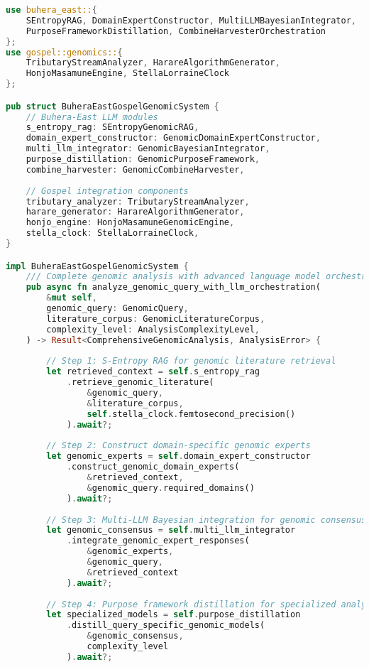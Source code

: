 \documentclass[12pt,a4paper]{article}
\begin{document}
\begin{lstlisting}[language=Rust, caption=Integrated Buhera-East Gospel Genomic System]
use buhera_east::{
    SEntropyRAG, DomainExpertConstructor, MultiLLMBayesianIntegrator,
    PurposeFrameworkDistillation, CombineHarvesterOrchestration
};
use gospel::genomics::{
    TributaryStreamAnalyzer, HarareAlgorithmGenerator, 
    HonjoMasamuneEngine, StellaLorraineClock
};

pub struct BuheraEastGospelGenomicSystem {
    // Buhera-East LLM modules
    s_entropy_rag: SEntropyGenomicRAG,
    domain_expert_constructor: GenomicDomainExpertConstructor,
    multi_llm_integrator: GenomicBayesianIntegrator,
    purpose_distillation: GenomicPurposeFramework,
    combine_harvester: GenomicCombineHarvester,
    
    // Gospel integration components
    tributary_analyzer: TributaryStreamAnalyzer,
    harare_generator: HarareAlgorithmGenerator,
    honjo_engine: HonjoMasamuneGenomicEngine,
    stella_clock: StellaLorraineClock,
}

impl BuheraEastGospelGenomicSystem {
    /// Complete genomic analysis with advanced language model orchestration
    pub async fn analyze_genomic_query_with_llm_orchestration(
        &mut self,
        genomic_query: GenomicQuery,
        literature_corpus: GenomicLiteratureCorpus,
        complexity_level: AnalysisComplexityLevel,
    ) -> Result<ComprehensiveGenomicAnalysis, AnalysisError> {
        
        // Step 1: S-Entropy RAG for genomic literature retrieval
        let retrieved_context = self.s_entropy_rag
            .retrieve_genomic_literature(
                &genomic_query,
                &literature_corpus,
                self.stella_clock.femtosecond_precision()
            ).await?;
        
        // Step 2: Construct domain-specific genomic experts
        let genomic_experts = self.domain_expert_constructor
            .construct_genomic_domain_experts(
                &retrieved_context,
                &genomic_query.required_domains()
            ).await?;
        
        // Step 3: Multi-LLM Bayesian integration for genomic consensus
        let genomic_consensus = self.multi_llm_integrator
            .integrate_genomic_expert_responses(
                &genomic_experts,
                &genomic_query,
                &retrieved_context
            ).await?;
        
        // Step 4: Purpose framework distillation for specialized analysis
        let specialized_models = self.purpose_distillation
            .distill_query_specific_genomic_models(
                &genomic_consensus,
                complexity_level
            ).await?;
        

\end{lstlisting}
\end{document}
